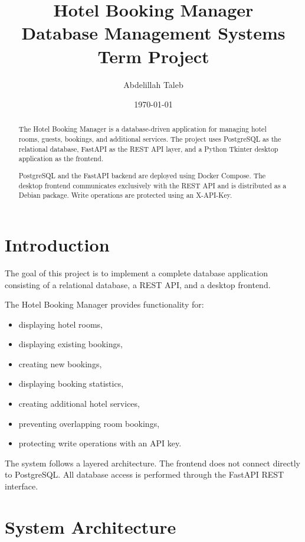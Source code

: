 \documentclass[12pt,a4paper]{article}
\title{
    \textbf{Hotel Booking Manager}\\
    \large Database Management Systems Term Project
}
\author{Abdelillah Taleb}
\date{\today}
\begin{document}
\maketitle

\begin{abstract}
The Hotel Booking Manager is a database-driven application for managing
hotel rooms, guests, bookings, and additional services. The project uses
PostgreSQL as the relational database, FastAPI as the REST API layer, and
a Python Tkinter desktop application as the frontend.

PostgreSQL and the FastAPI backend are deployed using Docker Compose.
The desktop frontend communicates exclusively with the REST API and is
distributed as a Debian package. Write operations are protected using an
X-API-Key.
\end{abstract}

\tableofcontents
\newpage

\section{Introduction}

The goal of this project is to implement a complete database application
consisting of a relational database, a REST API, and a desktop frontend.

The Hotel Booking Manager provides functionality for:

\begin{itemize}
    \item displaying hotel rooms,
    \item displaying existing bookings,
    \item creating new bookings,
    \item displaying booking statistics,
    \item creating additional hotel services,
    \item preventing overlapping room bookings,
    \item protecting write operations with an API key.
\end{itemize}

The system follows a layered architecture. The frontend does not connect
directly to PostgreSQL. All database access is performed through the
FastAPI REST interface.

\section{System Architecture}
\end{document}
